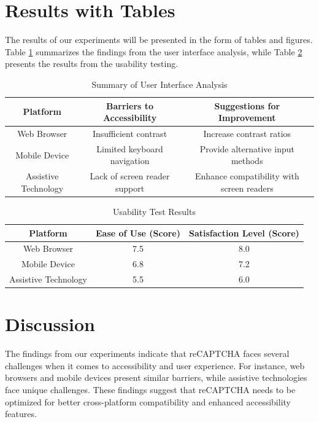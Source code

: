 \documentclass{article}
\begin{document}
\section{Results with Tables}
The results of our experiments will be presented in the form of tables and figures. Table \ref{tab:user_interface_analysis} summarizes the findings from the user interface analysis, while Table \ref{tab:usability_test_results} presents the results from the usability testing.

\begin{table}[ht]
    \centering
    \begin{tabular}{|c|c|c|}
        \hline
        Platform & Barriers to Accessibility & Suggestions for Improvement \\
        \hline
        Web Browser & Insufficient contrast & Increase contrast ratios \\
        Mobile Device & Limited keyboard navigation & Provide alternative input methods \\
        Assistive Technology & Lack of screen reader support & Enhance compatibility with screen readers \\
        \hline
    \end{tabular}
    \caption{Summary of User Interface Analysis}
    \label{tab:user_interface_analysis}
\end{table}

\begin{table}[ht]
    \centering
    \begin{tabular}{|c|c|c|}
        \hline
        Platform & Ease of Use (Score) & Satisfaction Level (Score) \\
        \hline
        Web Browser & 7.5 & 8.0 \\
        Mobile Device & 6.8 & 7.2 \\
        Assistive Technology & 5.5 & 6.0 \\
        \hline
    \end{tabular}
    \caption{Usability Test Results}
    \label{tab:usability_test_results}
\end{table}

\section{Discussion}
The findings from our experiments indicate that reCAPTCHA faces several challenges when it comes to accessibility and user experience. For instance, web browsers and mobile devices present similar barriers, while assistive technologies face unique challenges. These findings suggest that reCAPTCHA needs to be optimized for better cross-platform compatibility and enhanced accessibility features.
\end{document}
